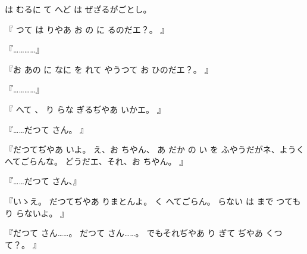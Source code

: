 は
むるに
て
へど
は
ぜざるがごとし。

『
つて
は
りやあ
お
の
に
るのだエ？。
』

『…………』

『お
あの
に
なに
を
れて
やうつて
お
ひのだエ？。
』

『…………』

『
へて
、
り
らな
ぎるぢやあ
いかエ。
』

『……だつて
さん。
』

『だつてぢやあ
いよ。
え、お
ちやん、
あ
だか
の
い
を
ふやうだがネ、ようく
へてごらんな。
どうだエ、それ、お
ちやん。
』

『……だつて
さん、』

『いゝえ。
だつてぢやあ
りまとんよ。
く
へてごらん。
らない
は
まで
つても
り
らないよ。
』

『だつて
さん……。
だつて
さん……。
でもそれぢやあ
り
ぎて
ぢやあ
くつて？。
』

